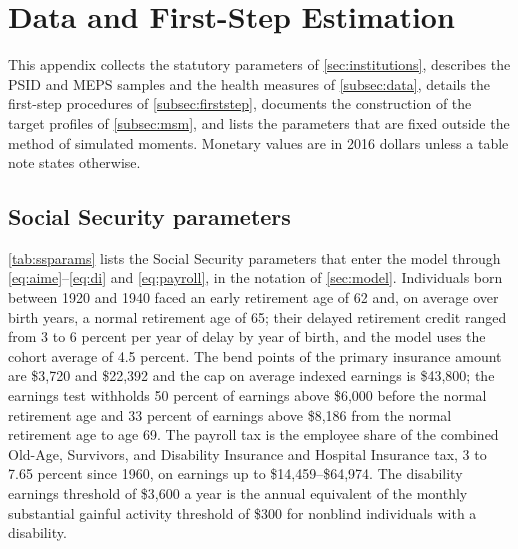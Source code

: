 \section{Data and First-Step Estimation}\label{app:data}

This appendix collects the statutory parameters of \autoref{sec:institutions}, describes the PSID and MEPS samples and the health measures of \autoref{subsec:data}, details the first-step procedures of \autoref{subsec:firststep}, documents the construction of the target profiles of \autoref{subsec:msm}, and lists the parameters that are fixed outside the method of simulated moments. Monetary values are in 2016 dollars unless a table note states otherwise.

\subsection{Social Security parameters}\label{app:ssparams}

\autoref{tab:ssparams} lists the Social Security parameters that enter the model through \eqref{eq:aime}--\eqref{eq:di} and \eqref{eq:payroll}, in the notation of \autoref{sec:model}. Individuals born between 1920 and 1940 faced an early retirement age of 62 and, on average over birth years, a normal retirement age of 65; their delayed retirement credit ranged from 3 to 6 percent per year of delay by year of birth, and the model uses the cohort average of 4.5 percent. %
The bend points of the primary insurance amount are \$3,720 and \$22,392 and the cap on average indexed earnings is \$43,800; the earnings test withholds 50 percent of earnings above \$6,000 before the normal retirement age and 33 percent of earnings above \$8,186 from the normal retirement age to age 69. %
The payroll tax is the employee share of the combined Old-Age, Survivors, and Disability Insurance and Hospital Insurance tax, 3 to 7.65 percent since 1960, on earnings up to \$14,459--\$64,974. %
The disability earnings threshold of \$3,600 a year is the annual equivalent of the monthly substantial gainful activity threshold of \$300 for nonblind individuals with a disability. %

